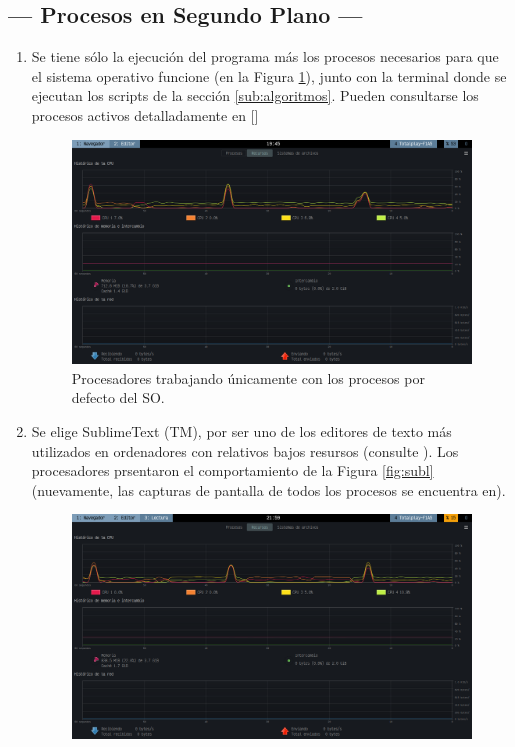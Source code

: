 \documentclass[11pt,a4paper]{article}
\begin{document}

\subsection{--- Procesos en Segundo Plano ---} %
\label{sub:segundo_plano}
\begin{enumerate}
	\item[\fbox{Sin procesos}] Se tiene sólo la ejecución del programa más los procesos necesarios para que el sistema operativo funcione (en la Figura \ref{fig:sin_procesos}), junto con la terminal donde se ejecutan los scripts de la sección \ref{sub:algoritmos}. Pueden consultarse los procesos activos detalladamente en []
		\begin{figure}[hbt!]
			\centering
			\includegraphics[width= 0.9 \linewidth]{IMAGENES/6/1_sin_procesos}
			\caption{Procesadores trabajando únicamente con los procesos por defecto del SO.}
			\label{fig:sin_procesos}
		\end{figure}
		\newpage
	\item[\fbox{Editor de Texto}] Se elige SublimeText (TM), por ser uno de los editores de texto más utilizados en ordenadores con relativos bajos resursos (consulte ). Los procesadores prsentaron el comportamiento de la Figura \ref{fig:subl} (nuevamente, las capturas de pantalla de todos los procesos se encuentra en).
		\begin{figure}[hbt!]
			\centering
			\includegraphics[width= 0.8 \linewidth]{IMAGENES/6/4_sublime_text}

\end{figure}
\end{enumerate}
\end{document}
